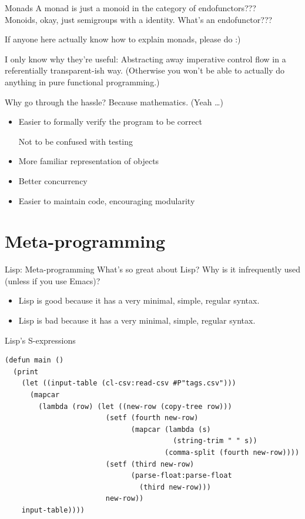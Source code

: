 \documentclass[aspectratio=169]{beamer}
\begin{document}
\begin{frame}{Monads}
	A monad is just a monoid in the category of endofunctors???\\
	\pause
	Monoids, okay, just semigroups with a identity. What's an endofunctor???

	\pause

	\centering
	If anyone here actually know how to explain monads, please do :)

	\pause

	\flushleft
	I only know why they're useful: Abstracting away imperative control flow in a referentially transparent-ish way. (Otherwise you won't be able to actually do anything in pure functional programming.)
\end{frame}

\begin{frame}{Why go through the hassle?}
	Because {\Large mathematics}. (Yeah \ldots)
	\pause
	\begin{itemize}
		\item Easier to formally verify the program to be correct

			Not to be confused with testing
		\item More familiar representation of objects
		\item Better concurrency
		\item Easier to maintain code, encouraging modularity
	\end{itemize}
\end{frame}

\section{Meta-programming}

\begin{frame}{Lisp: Meta-programming}
	What's so great about Lisp? Why is it infrequently used (unless if you use Emacs)?
	\pause
	\begin{itemize}
		\item Lisp is good because it has a very minimal, simple, regular syntax.
		\pause
		\item Lisp is bad because it has a very minimal, simple, regular syntax.
	\end{itemize}
\end{frame}

\begin{frame}[fragile]{Lisp's S-expressions}
	\small
	\begin{verbatim}
(defun main ()
  (print
    (let ((input-table (cl-csv:read-csv #P"tags.csv")))
      (mapcar
        (lambda (row) (let ((new-row (copy-tree row)))
                        (setf (fourth new-row)
                              (mapcar (lambda (s)
                                        (string-trim " " s))
                                      (comma-split (fourth new-row))))
                        (setf (third new-row)
                              (parse-float:parse-float
                                (third new-row)))
                        new-row))
	input-table))))
	\end{verbatim}
\end{frame}
\end{document}
